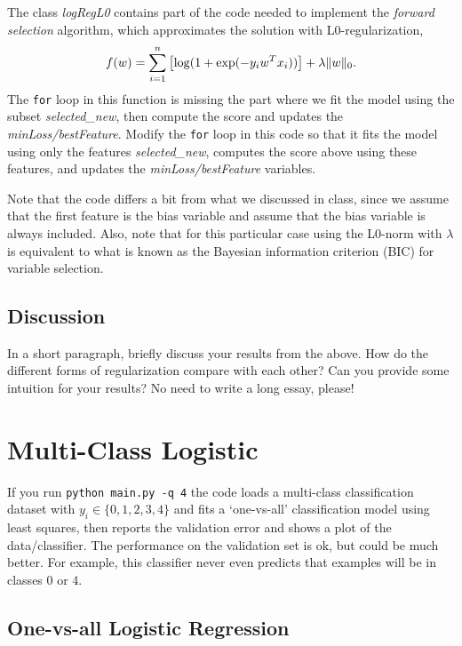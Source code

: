 \documentclass{article}
\begin{document}
The class \emph{logRegL0} contains part of the code needed to implement the \emph{forward selection} algorithm,
which approximates the solution with L0-regularization,
\[
f(w) =  \sum_{i=1}^n \left[\log(1+\exp(-y_iw^Tx_i))\right] + \lambda\|w\|_0.
\]
The \texttt{for} loop in this function is missing the part where we fit the model using the subset \emph{selected\_new},
then compute the score and updates the \emph{minLoss/bestFeature}.
Modify the \texttt{for} loop in this code so that it fits the model using only
the features \emph{selected\_new}, computes the score above using these features,
and updates the \emph{minLoss/bestFeature} variables.

Note that the code differs a bit from what we discussed in class,
since we assume that the first feature is the bias variable and assume that the
bias variable is always included. Also, note that for this particular case using
the L0-norm with $\lambda$ is equivalent to what is known as the Bayesian
information criterion (BIC) for variable selection.

\subsection{Discussion}

In a short paragraph, briefly discuss your results from the above. How do the
different forms of regularization compare with each other?
Can you provide some intuition for your results? No need to write a long essay, please!


\section{Multi-Class Logistic}

If you run \verb|python main.py -q 4| the code loads a multi-class
classification dataset with $y_i \in \{0,1,2,3,4\}$ and fits a `one-vs-all' classification
model using least squares, then reports the validation error and shows a plot of the data/classifier.
The performance on the validation set is ok, but could be much better.
For example, this classifier never even predicts that examples will be in classes 0 or 4.


\subsection{One-vs-all Logistic Regression}
\end{document}
